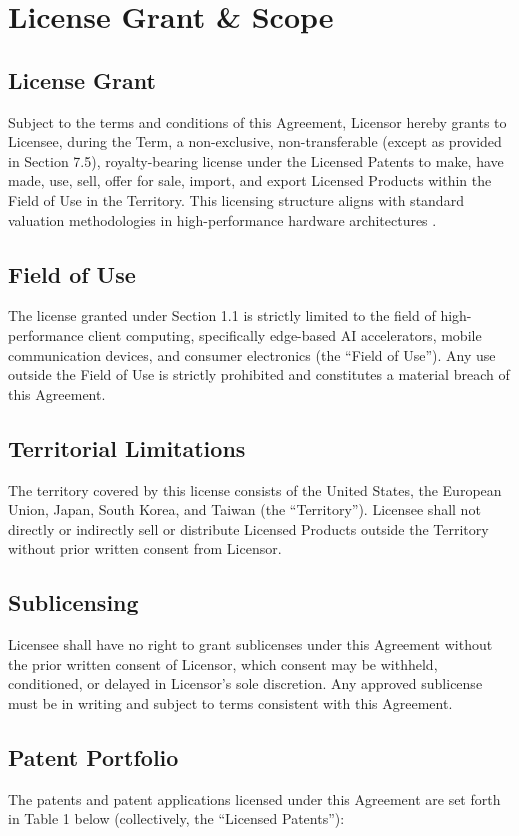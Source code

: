 \section{License Grant \& Scope}

\subsection{License Grant} Subject to the terms and conditions of this Agreement, Licensor hereby grants to Licensee, during the Term, a non-exclusive, non-transferable (except as provided in Section 7.5), royalty-bearing license under the Licensed Patents to make, have made, use, sell, offer for sale, import, and export Licensed Products within the Field of Use in the Territory. This licensing structure aligns with standard valuation methodologies in high-performance hardware architectures \cite{vance2024patent}.

\subsection{Field of Use} The license granted under Section 1.1 is strictly limited to the field of high-performance client computing, specifically edge-based AI accelerators, mobile communication devices, and consumer electronics (the ``Field of Use''). Any use outside the Field of Use is strictly prohibited and constitutes a material breach of this Agreement.

\subsection{Territorial Limitations} The territory covered by this license consists of the United States, the European Union, Japan, South Korea, and Taiwan (the ``Territory''). Licensee shall not directly or indirectly sell or distribute Licensed Products outside the Territory without prior written consent from Licensor.

\subsection{Sublicensing} Licensee shall have no right to grant sublicenses under this Agreement without the prior written consent of Licensor, which consent may be withheld, conditioned, or delayed in Licensor's sole discretion. Any approved sublicense must be in writing and subject to terms consistent with this Agreement.

\subsection{Patent Portfolio} The patents and patent applications licensed under this Agreement are set forth in Table 1 below (collectively, the ``Licensed Patents''):

